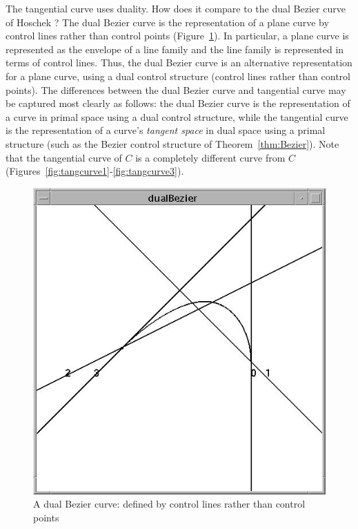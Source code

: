 \documentclass[12pt]{article}
\begin{document}
The tangential curve uses duality.
How does it compare to the dual Bezier curve of Hoschek \cite{hoschek83}?
The dual Bezier curve is the representation of a plane curve by control lines
rather than control points (Figure~\ref{fig:Hoschekdual}).
In particular, a plane curve is represented as the envelope of a line family
and the line family is represented in terms of control lines.
Thus, the dual Bezier curve is an alternative representation for a plane curve,
using a dual control structure (control lines rather than control points).
The differences between the dual Bezier curve
and tangential curve may be captured most clearly as follows:
the dual Bezier curve is the representation of a curve in primal space
using a dual control structure,
while the tangential curve is the representation of a curve's {\em tangent space}
in dual space using a primal structure (such as the Bezier control structure
of Theorem~\ref{thm:Bezier}).
Note that the tangential curve of $C$ is a completely different curve from $C$
(Figures~\ref{fig:tangcurve1}-\ref{fig:tangcurve3}).


\begin{figure}
\begin{center}
\includegraphics*[scale=.4]{img/jjdube.jpg}
\end{center}
\caption{A dual Bezier curve: defined by control lines rather than control points}
\label{fig:Hoschekdual}
\end{figure}
\end{document}
